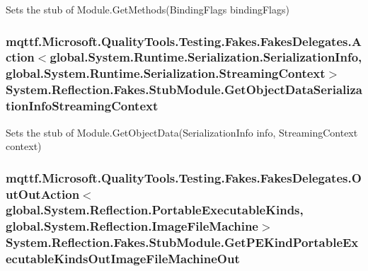 Sets the stub of Module.\-Get\-Methods(\-Binding\-Flags binding\-Flags)

\hypertarget{class_system_1_1_reflection_1_1_fakes_1_1_stub_module_aa85d2e1fc440c7c8e52221d00f5b9716}{
\subsubsection[{Get\-Object\-Data\-Serialization\-Info\-Streaming\-Context}]{\setlength{\rightskip}{0pt plus 5cm}mqttf.\-Microsoft.\-Quality\-Tools.\-Testing.\-Fakes.\-Fakes\-Delegates.\-Action$<$global.\-System.\-Runtime.\-Serialization.\-Serialization\-Info, global.\-System.\-Runtime.\-Serialization.\-Streaming\-Context$>$ System.\-Reflection.\-Fakes.\-Stub\-Module.\-Get\-Object\-Data\-Serialization\-Info\-Streaming\-Context}}\label{class_system_1_1_reflection_1_1_fakes_1_1_stub_module_aa85d2e1fc440c7c8e52221d00f5b9716}


Sets the stub of Module.\-Get\-Object\-Data(\-Serialization\-Info info, Streaming\-Context context)

\hypertarget{class_system_1_1_reflection_1_1_fakes_1_1_stub_module_a954d56ec4d9f110b6bab8848b5913c53}{
\subsubsection[{Get\-P\-E\-Kind\-Portable\-Executable\-Kinds\-Out\-Image\-File\-Machine\-Out}]{\setlength{\rightskip}{0pt plus 5cm}mqttf.\-Microsoft.\-Quality\-Tools.\-Testing.\-Fakes.\-Fakes\-Delegates.\-Out\-Out\-Action$<$global.\-System.\-Reflection.\-Portable\-Executable\-Kinds, global.\-System.\-Reflection.\-Image\-File\-Machine$>$ System.\-Reflection.\-Fakes.\-Stub\-Module.\-Get\-P\-E\-Kind\-Portable\-Executable\-Kinds\-Out\-Image\-File\-Machine\-Out}}\label{class_system_1_1_reflection_1_1_fakes_1_1_stub_module_a954d56ec4d9f110b6bab8848b5913c53}


